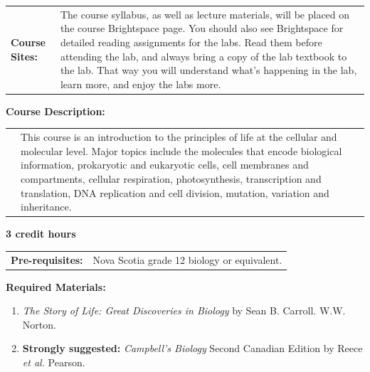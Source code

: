 \documentclass[hidelinks]{article}
\begin{document}
	
	\begin{tabular}{@{} p{2.3cm} p{13.9cm}}
		\textbf{Course Sites:} & The course syllabus, as well as lecture materials, will be placed on the course Brightspace page. You should also see Brightspace for detailed reading assignments for the labs. Read them before attending the lab, and always bring a copy of the lab textbook to the lab. That way you will understand what's happening in the lab, learn more, and enjoy the labs more.\\
	\end{tabular}


	\textbf{Course Description:}\\
	\begin{tabular}{@{} p{2.3cm} p{13.9cm}}
		 & This course is an introduction to the principles of life at the cellular and molecular level. Major topics include the molecules that encode biological information, prokaryotic and eukaryotic cells, cell membranes and compartments, cellular respiration, photosynthesis, transcription and translation, DNA replication and cell division, mutation, variation and inheritance.
	\end{tabular}

	\textbf{3 credit hours}

	\begin{tabular}{@{} p{2.6cm} l }
		\textbf{Pre-requisites:} & Nova Scotia grade 12 biology or equivalent. 
	\end{tabular}

	\textbf{Required Materials:}
	\begin{enumerate}[topsep=-8pt]
		\item \emph{The Story of Life: Great Discoveries in Biology} by Sean B. Carroll. W.W. Norton.
		\item \textbf{Strongly suggested:} \emph{Campbell's Biology} Second Canadian Edition by Reece \emph{et al.} Pearson.
	\end{enumerate}	
\end{document}
